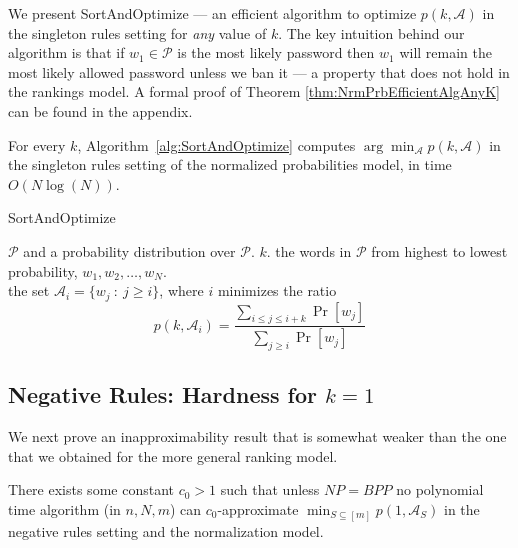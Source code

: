 \documentclass[prodmode,acmec]{ec-acmsmall}
\newcommand{\PasswordSpace}{\mathcal{P}}
\begin{document}
We present SortAndOptimize --- an efficient algorithm to optimize $p\left(k, \mathcal{A}\right)$ in the singleton rules setting for {\em any} value of $k$. 
The key intuition behind our algorithm is that if $w_1 \in \PasswordSpace$ is the most likely password then $w_1$ will remain the most likely allowed password unless we ban it --- a property that does not hold in the rankings model. A formal proof of Theorem \ref{thm:NrmPrbEfficientAlgAnyK} can be found in the appendix.
\newcommand{\thmNrmPrbEfficientAlgAnyK}{For every $k$, Algorithm~\ref{alg:SortAndOptimize} computes $\arg \min_{\mathcal{A}} p\left(k,\mathcal{A} \right)$ in the singleton rules setting of the normalized probabilities model, in time $O(N\log(N))$.}
\begin{theorem} \label{thm:NrmPrbEfficientAlgAnyK}
\thmNrmPrbEfficientAlgAnyK
\end{theorem}


\begin{algorithm}
\caption{SortAndOptimize}
\begin{algorithmic}
 $\PasswordSpace$ and a probability distribution over $\PasswordSpace$.
 $k$.
 the words in $\PasswordSpace$ from highest to lowest probability, $w_1, w_2, \ldots, w_N$.\\
\Return the set $\mathcal{A}_i = \{ w_j ~:~ j \geq i\}$, where $i$ minimizes the ratio \[ p(k,\mathcal{A}_i) =  \frac {\sum_{i \leq j \leq i+k} \Pr[w_j]} {\sum_{j \geq i} \Pr[w_j]} \]
\end{algorithmic}
\label{alg:SortAndOptimize}
\end{algorithm}

\subsection{Negative Rules: Hardness for $k=1$} \label{subsec:HardnessOptimizeP1BanningNrmPrb}



We next prove an inapproximability result that is somewhat weaker than the one that we obtained for the more general ranking model.

\begin{theorem}\label{thm:NrmPrbHardnessOptimizeP1}
There exists some constant $c_0>1$ such that unless $NP=BPP$ no polynomial time algorithm (in $n, N, m$) can $c_0$-approximate $\min_{S \subseteq [m]} p\left(1,\mathcal{A}_S\right)$ in the negative rules setting and the normalization model.
\end{theorem}
\end{document}
